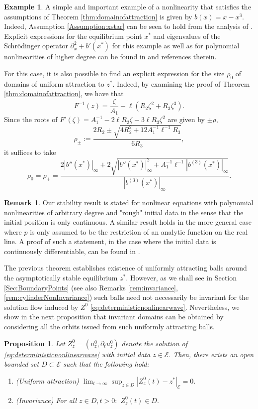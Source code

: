 \documentclass[10pt, reqno]{amsart}
\newcommand{\e}{\mathcal{E}}
\newtheorem{prop}{Proposition}
\theoremstyle{definition}
\newtheorem{rem}{Remark}
\newtheorem{example}{Example}
\numberwithin{lem}{section}
\numberwithin{cor}{section}
\numberwithin{prop}{section}
\numberwithin{thm}{section}
\numberwithin{dfn}{section}
\begin{document}
\begin{example}\label{rem:Xstarexamples}
 A simple and important example of a nonlinearity  that satisfies the assumptions of Theorem \ref{thm:domainofattraction} is given by $b(x)=x-x^3.$ Indeed, Assumption \ref{Assumption:xstar} can be seen to hold from the analysis of \cite[Section 7]{faris1982large}. Explicit expressions for the equilibrium point $x^*$ and eigenvalues of the Schr\"odinger operator $\partial^2_x+b'(x^*)$ for this example as well as for polynomial nonlinearities of higher degree can be found in \cite[Section 5.1]{gasteratos2023importance} and references therein.

For this case, it is also possible to find an explicit expression for the size $\rho_0$ of domains of uniform attraction to $z^*.$ Indeed, by examining the proof of Theorem \ref{thm:domainofattraction}, we have that 
$$F^{-1}(z)=\frac{\zeta}{A_1}-\ell(R_2 \zeta^2+R_3\zeta^3).$$
Since the roots of $F'(\zeta)=A_1^{-1}-2\ell R_2\zeta-3\ell R_3\zeta^2$ are given by $\pm\rho,$
$$\rho_{\pm}:=\frac{2 R_2\pm\sqrt{4R_2^2+12A_1^{-1}\ell^{-1} R_3}}{6 R_3},$$
it suffices to take 
$$\rho_0=\rho_{+}=\frac{2|b''(x^*)|_{\infty}+2\sqrt{|b''(x^*)|_{\infty}^2+A_1^{-1}\ell^{-1}|b^{(3)}(x^*)|_{\infty} }}{|b^{(3)}(x^*)|_{\infty}}.$$
\end{example} 
\begin{rem} Our stability result is stated for nonlinear equations with polynomial nonlinearities of arbitrary degree and "rough" initial data in the sense that the initial position is only continuous. A similar result holds in the more general case where $p$ is only assumed to be the restriction of an analytic function on the real line. A proof of such a statement, in the case where the initial data is continuously differentiable, can be found in \cite{sattinger1968stability}.
\end{rem}

The previous theorem establishes existence of uniformly attracting balls around the asymptotically stable equilibrium $z^*.$ However, as we shall see in Section \ref{Sec:BoundaryPoints} (see also Remarks \ref{rem:invariance},  \ref{rem:cylinderNonInvariance}) such balls need not necessarily be invariant for the solution flow induced by $Z^0$ \eqref{eq:deterministicnonlinearwave}. Nevertheless, we show in the next proposition that invariant domains can be obtained by considering all the orbits issued from such uniformly attracting balls.


\begin{prop}\label{corr:DExistence} Let $Z^0_z=(u^0_z, \partial_tu^0_z)$ denote the solution of \eqref{eq:deterministicnonlinearwave} with initial data $z\in\e.$ Then, there exists an open bounded set $D\subset\e$ such that the following hold:
\begin{enumerate}
    \item (Uniform attraction) $\lim_{t\to\infty}\sup_{z\in D}|Z^0_z(t)-z^*|_\e =0.$
    \item (Invariance) For all $z\in D, t>0:$ $Z^0_z(t)\in D.$
\end{enumerate}    
\end{prop}
\end{document}
